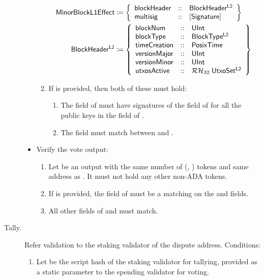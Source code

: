 \documentclass[../hydrozoa.tex]{subfiles}
\begin{document}
\begin{description}
\begin{itemize}
\begin{enumerate}[resume]
            \begin{equation*}
            \begin{split}
              \T{MinorBlockL1Effect} &\coloneq \left\{
                \begin{array}{lll}
                  \T{blockHeader} &::& \T{BlockHeader^{L2}} \\
                  \T{multisig} &::& [\T{Signature}]
                \end{array}\right\}\\
              \blockHeaderTypeName{} &\coloneq \blockHeaderTypeBody{}
            \end{split}
            \end{equation*}
          \item If  is provided, then both of these must hold:
            \begin{enumerate}
              \item The  field of  must have signatures of the  field of  for all the public keys in the  field of .
              \item The  field must match between  and .
            \end{enumerate}
        \end{enumerate}
      \item Verify the vote output:
        \begin{enumerate}[resume]
          \item Let  be an output with the same number of (, ) tokens and same address as .
          It must not hold any other non-ADA tokens.
          \item If  is provided, the  field of  must be a  matching  on the  and  fields.
          \item All other fields of  and  must match.
        \end{enumerate}
    \end{itemize}
  \item[Tally.] Refer validation to the staking validator of the dispute address.
    Conditions:
    \begin{enumerate}
      \item Let  be the script hash of the staking validator for tallying, provided as a static parameter to the spending validator for voting.

\end{enumerate}
\end{description}
\end{document}
